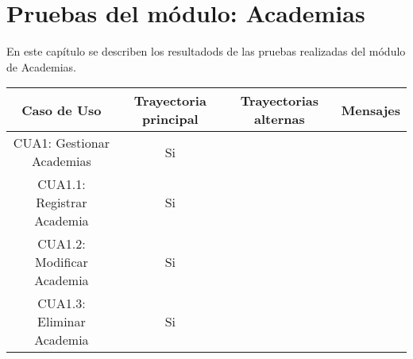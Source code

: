 \newpage

\section{Pruebas del módulo: Academias} \label{chp:pruebasAcademias}
En este capítulo se describen los resultadods de las pruebas realizadas del módulo de Academias.

\begin{center}
	\begin{tabular}{ |c|c|c|c| } 
		\hline
		Caso de Uso & Trayectoria principal & Trayectorias alternas & Mensajes \\
		\hline 
		CUA1: Gestionar Academias & Si &  & \\ 
		CUA1.1: Registrar Academia & Si &  & \\ 
		CUA1.2: Modificar Academia & Si &  & \\ 
		CUA1.3: Eliminar Academia & Si &  & \\ 
		\hline
	\end{tabular}
\end{center}
